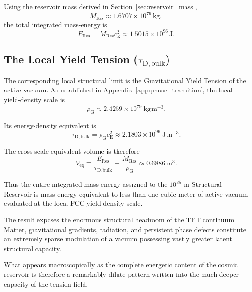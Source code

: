 Using the reservoir mass derived in
\hyperref[sec:reservoir_mass]{Section~\ref*{sec:reservoir_mass}},
\begin{equation}
    M_{\mathrm{Res}}
    \approx
    1.6707\times10^{79}\ \mathrm{kg},
\end{equation}
the total integrated mass-energy is
\begin{equation}
    E_{\mathrm{Res}}
    =
    M_{\mathrm{Res}}c_{\mathrm E}^2
    \approx
    1.5015\times10^{96}\ \mathrm{J}.
\end{equation}


\subsection{The Local Yield Tension ($\tau_{\mathrm{D,bulk}}$)}

The corresponding local structural limit is the Gravitational Yield Tension of the active vacuum. As established in
\hyperref[app:phase_transition]{Appendix~\ref*{app:phase_transition}},
the local yield-density scale is
\begin{equation}
    \rho_{\mathrm G}
    \approx
    2.4259\times10^{79}\ \mathrm{kg\,m^{-3}}.
\end{equation}

Its energy-density equivalent is
\begin{equation}
    \tau_{\mathrm{D,bulk}}
    =
    \rho_{\mathrm G}c_{\mathrm E}^2
    \approx
    2.1803\times10^{96}\ \mathrm{J\,m^{-3}}.
\end{equation}

The cross-scale equivalent volume is therefore
\begin{equation}
    V_{\mathrm{eq}}
    \equiv
    \frac{E_{\mathrm{Res}}}
    {\tau_{\mathrm{D,bulk}}}
    =
    \frac{M_{\mathrm{Res}}}
    {\rho_{\mathrm G}}
    \approx
    0.6886\ \mathrm{m^3}.
\end{equation}

Thus the entire integrated mass-energy assigned to the $10^{35}$ m Structural Reservoir is mass-energy equivalent to less than one cubic meter of active vacuum evaluated at the local FCC yield-density scale.

The result exposes the enormous structural headroom of the TFT continuum. Matter, gravitational gradients, radiation, and persistent phase defects constitute an extremely sparse modulation of a vacuum possessing vastly greater latent structural capacity.

What appears macroscopically as the complete energetic content of the cosmic reservoir is therefore a remarkably dilute pattern written into the much deeper capacity of the tension field.


